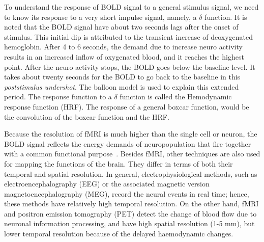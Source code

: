 To understand the response of BOLD signal to a general stimulus signal, we need
to know its response to a very short impulse signal, namely, a $\delta$
function. It is noted that the BOLD signal have about two seconds lags after the
onset of stimulus. This initial dip is attributed to the transient increase of
deoxygenated hemoglobin. After 4 to 6 seconds, the demand due to increase neuro
activity results in an increased inflow of oxygenated blood, and it reaches the
highest point. After the neuro activity stops, the BOLD goes below the baseline
level. It takes about twenty seconds for the BOLD to go back to the baseline in this
\emph{poststimulus undershot}. The balloon model \cite{buxton1998dynamics} is
used to explain this extended period. The response function to a $\delta$
function is called the Hemodynamic response function (HRF). The response of a
general boxcar function, would be the convolution of the boxcar function and the
HRF.

Because the resolution of fMRI is much higher than the single cell or neuron,
the BOLD signal reflects the energy demands of neuropopulation that fire
together with a common functional purpose~\cite{huettel2004functional,
  jezzard2003functional}. Besides fMRI, other techniques are also used for
mapping the functions of the brain. They differ in terms of both their temporal
and spatial resolution. In general, electrophysiological methods, such as
electroencephalography (EEG) or the associated magnetic version
magnetoencephalography (MEG), record the neural events in real time; hence,
these methods have relatively high temporal resolution. On the other hand, fMRI
and positron emission tomography (PET) detect the change of blood flow due to
neuronal information processing, and have high spatial resolution (1-5 mm), but
lower temporal resolution because of the delayed haemodynamic changes.

